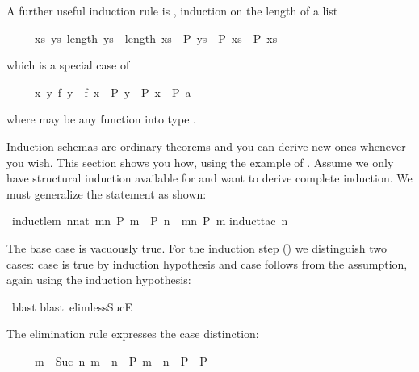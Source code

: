 \begin{isabellebody}
\begin{isamarkuptext}
A further useful induction rule is ,
induction on the length of a list
\begin{isabelle}%
\ \ \ \ \ {\isacharparenleft}{\isasymAnd}xs{\isachardot}\ {\isasymforall}ys{\isachardot}\ length\ ys\ {\isacharless}\ length\ xs\ {\isasymlongrightarrow}\ P\ ys\ {\isasymLongrightarrow}\ P\ xs{\isacharparenright}\ {\isasymLongrightarrow}\ P\ xs%
\end{isabelle}
which is a special case of 
\begin{isabelle}%
\ \ \ \ \ {\isacharparenleft}{\isasymAnd}x{\isachardot}\ {\isasymforall}y{\isachardot}\ f\ y\ {\isacharless}\ f\ x\ {\isasymlongrightarrow}\ P\ y\ {\isasymLongrightarrow}\ P\ x{\isacharparenright}\ {\isasymLongrightarrow}\ P\ a%
\end{isabelle}
where  may be any function into type .%
\end{isamarkuptext}%
%
%
\begin{isamarkuptext}%
\label{sec:derive-ind}
%
Induction schemas are ordinary theorems and you can derive new ones
whenever you wish.  This section shows you how, using the example
of . Assume we only have structural induction
available for  and want to derive complete induction.  We
must generalize the statement as shown:%
\end{isamarkuptext}%
\ induct{\isacharunderscore}lem{\isacharcolon}\ {\isachardoublequote}{\isacharparenleft}{\isasymAnd}n{\isacharcolon}{\isacharcolon}nat{\isachardot}\ {\isasymforall}m{\isacharless}n{\isachardot}\ P\ m\ {\isasymLongrightarrow}\ P\ n{\isacharparenright}\ {\isasymLongrightarrow}\ {\isasymforall}m{\isacharless}n{\isachardot}\ P\ m{\isachardoublequote}\isanewline
{}induct{\isacharunderscore}tac\ n{\isacharparenright}%
\begin{isamarkuptxt}%
\noindent
The base case is vacuously true. For the induction step () we distinguish two cases: case  is true by induction
hypothesis and case  follows from the assumption, again using
the induction hypothesis:%
\end{isamarkuptxt}%
\ blast{\isacharparenright}\isanewline
{}blast\ elim{\isacharcolon}less{\isacharunderscore}SucE{\isacharparenright}%
\begin{isamarkuptext}%
\noindent
The elimination rule  expresses the case distinction:
\begin{isabelle}%
\ \ \ \ \ {\isasymlbrakk}m\ {\isacharless}\ Suc\ n{\isacharsemicolon}\ m\ {\isacharless}\ n\ {\isasymLongrightarrow}\ P{\isacharsemicolon}\ m\ {\isacharequal}\ n\ {\isasymLongrightarrow}\ P{\isasymrbrakk}\ {\isasymLongrightarrow}\ P%
\end{isabelle}


\end{isamarkuptext}
\end{isabellebody}
